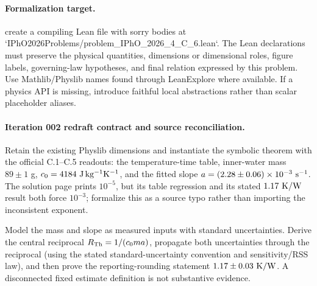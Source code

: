 \paragraph{Formalization target.}
create a compiling Lean file with sorry bodies at `IPhO2026Problems/problem\_IPhO\_2026\_4\_C\_6.lean`. The Lean declarations must preserve the physical quantities, dimensions or dimensional roles, figure labels, governing-law hypotheses, and final relation expressed by this problem.
Use Mathlib/Physlib names found through LeanExplore where available. If a physics API is missing, introduce faithful local abstractions rather than scalar placeholder aliases.

\paragraph{Iteration 002 redraft contract and source reconciliation.}
Retain the existing Physlib dimensions and instantiate the symbolic theorem
with the official C.1--C.5 readouts: the temperature-time table, inner-water
mass \(89\pm1\) g, \(c_0=4184\ {\rm J\,kg^{-1}K^{-1}}\), and the fitted
slope \(a=(2.28\pm0.06)\times10^{-3}\ {\rm s^{-1}}\).  The solution page
prints \(10^{-5}\), but its table regression and its stated
\(1.17\ {\rm K/W}\) result both force \(10^{-3}\); formalize this as a
source typo rather than importing the inconsistent exponent.

Model the mass and slope as measured inputs with standard uncertainties.
Derive the central reciprocal \(R_{\rm Th}=1/(c_0ma)\), propagate both
uncertainties through the reciprocal (using the stated standard-uncertainty
convention and sensitivity/RSS law), and then prove the reporting-rounding
statement \(1.17\pm0.03\ {\rm K/W}\).  A disconnected fixed estimate
definition is not substantive evidence.

